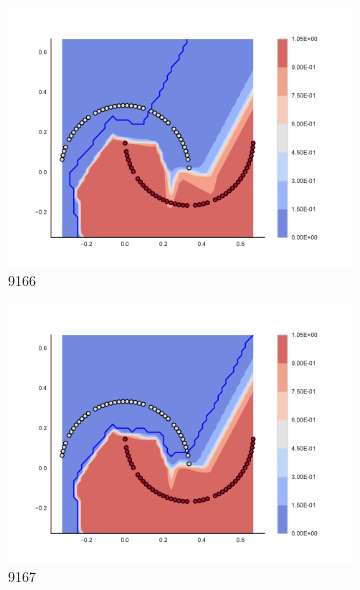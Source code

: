 \begin{figure}[h]
\begin{subfigure}[b]{0.09\textwidth}
    \includegraphics[clip, trim=2.35cm 1.75cm 4.5cm 0cm,width=\textwidth]{img/convergence/9166.pdf}
    \caption{9166}
    \label{fig:convergence_9166}
\end{subfigure}
%
\begin{subfigure}[b]{0.09\textwidth}
    \includegraphics[clip, trim=2.35cm 1.75cm 4.5cm 0cm,width=\textwidth]{img/convergence/9167.pdf}
    \caption{9167}
    \label{fig:convergence_9167}
\end{subfigure}
%
\begin{subfigure}[b]{0.09\textwidth}

\end{subfigure}
\end{figure}
